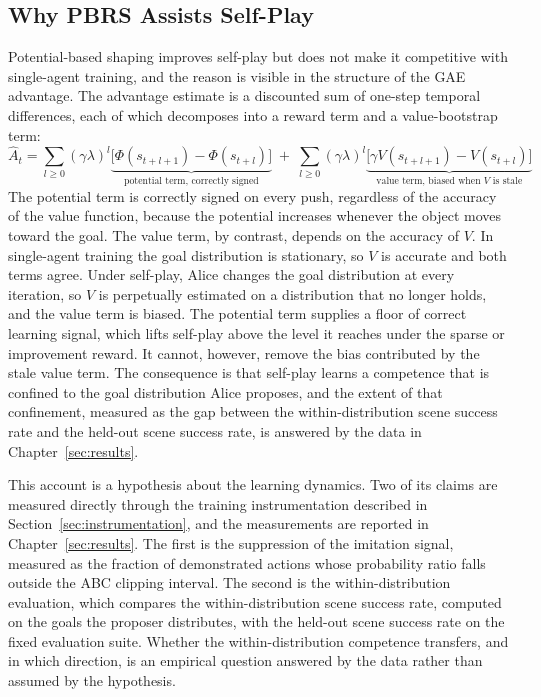 \subsection{Why PBRS Assists Self-Play}
\label{sec:pbrs_asp}

Potential-based shaping improves self-play but does not make it competitive with
single-agent training, and the reason is visible in the structure of the GAE
advantage. The advantage estimate is a discounted sum of one-step temporal
differences, each of which decomposes into a reward term and a value-bootstrap
term:
\begin{equation}
    \hat{A}_t = \sum_{l \geq 0} (\gamma\lambda)^l
    \underbrace{\big[\Phi(s_{t+l+1}) - \Phi(s_{t+l})\big]}_{\text{potential term, correctly signed}}
    \;+\; \sum_{l \geq 0} (\gamma\lambda)^l
    \underbrace{\big[\gamma V(s_{t+l+1}) - V(s_{t+l})\big]}_{\text{value term, biased when } V \text{ is stale}}
    \label{eq:gae_decomp}
\end{equation}
The potential term is correctly signed on every push, regardless of the accuracy
of the value function, because the potential increases whenever the object moves
toward the goal. The value term, by contrast, depends on the accuracy of $V$. In
single-agent training the goal distribution is stationary, so $V$ is accurate and
both terms agree. Under self-play, Alice changes the goal distribution at every
iteration, so $V$ is perpetually estimated on a distribution that no longer holds,
and the value term is biased. The potential term supplies a floor of correct
learning signal, which lifts self-play above the level it reaches under the sparse
or improvement reward. It cannot, however, remove the bias contributed by the
stale value term. The consequence is that self-play learns a competence that is
confined to the goal distribution Alice proposes, and the extent of that
confinement, measured as the gap between the within-distribution scene success
rate and the held-out scene success rate, is answered by the data in
Chapter~\ref{sec:results}.

This account is a hypothesis about the learning dynamics. Two of its claims are
measured directly through the training instrumentation described in
Section~\ref{sec:instrumentation}, and the measurements are reported in
Chapter~\ref{sec:results}. The first is the suppression of the imitation signal,
measured as the fraction of demonstrated actions whose probability ratio falls
outside the ABC clipping interval. The second is the within-distribution
evaluation, which compares the within-distribution scene success rate, computed
on the goals the proposer distributes, with the held-out scene success rate on
the fixed evaluation suite. Whether the within-distribution competence transfers,
and in which direction, is an empirical question answered by the data rather than
assumed by the hypothesis.

